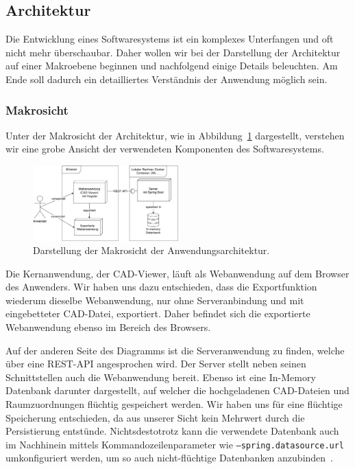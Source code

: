 \subsection{Architektur}
\label{subsec:architecture}

Die Entwicklung eines Softwaresystems ist ein komplexes Unterfangen und oft nicht mehr überschaubar.
Daher wollen wir bei der Darstellung der Architektur auf einer Makroebene beginnen und nachfolgend einige Details beleuchten.
Am Ende soll dadurch ein detailliertes Verständnis der Anwendung möglich sein.

\subsubsection{Makrosicht}
\label{subsubsec:macro-view}

Unter der Makrosicht der Architektur, wie in Abbildung~\ref{fig:macro-view-diagram} dargestellt, verstehen wir eine grobe Ansicht der verwendeten Komponenten des Softwaresystems.

\begin{figure}[h]
    \includegraphics[width=0.5\textwidth]{res/macro.pdf}
    \caption{Darstellung der Makrosicht der Anwendungsarchitektur.}
    \label{fig:macro-view-diagram}
\end{figure}

Die Kernanwendung, der CAD-Viewer, läuft als Webanwendung auf dem Browser des Anwenders.
Wir haben uns dazu entschieden, dass die Exportfunktion wiederum dieselbe Webanwendung, nur ohne Serveranbindung und mit eingebetteter CAD-Datei, exportiert.
Daher befindet sich die exportierte Webanwendung ebenso im Bereich des Browsers.

Auf der anderen Seite des Diagramms ist die Serveranwendung zu finden, welche über eine REST-API angesprochen wird.
Der Server stellt neben seinen Schnittstellen auch die Webanwendung bereit.
Ebenso ist eine In-Memory Datenbank darunter dargestellt, auf welcher die hochgeladenen CAD-Dateien und Raumzuordnungen flüchtig gespeichert werden.
Wir haben uns für eine flüchtige Speicherung entschieden, da aus unserer Sicht kein Mehrwert durch die Persistierung entstünde.
Nichtsdestotrotz kann die verwendete Datenbank auch im Nachhinein mittels Kommandozeilenparameter wie \texttt{--spring.datasource.url} umkonfiguriert werden, um so auch nicht-flüchtige Datenbanken anzubinden~\cite{JDBCSpringBoot}.


